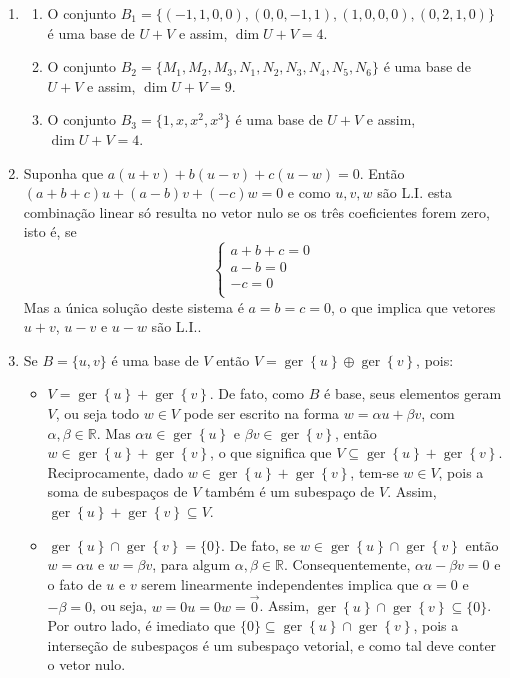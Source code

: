 \documentclass[12pt,a4paper]{article}
\newcommand*\ger[1]{\operatorname{ger}\left\{#1\right\}}
\newcommand*\R{\mathbb{R}}
\begin{document}
\begin{enumerate}
\begin{enumerate}
\end{enumerate}

\item \begin{enumerate}
\item O conjunto $B_1 = \{ (-1,1,0,0), (0,0,-1,1), (1,0,0,0), (0,2,1,0) \}$ é uma base de $U+V$ e assim, $\dim{U+V} = 4$.
\item O conjunto $B_2 = \{ M_1, M_2, M_3, N_1, N_2, N_3, N_4, N_5, N_6 \}$ é uma base de $U+V$ e assim, $\dim{U+V} = 9$.
\item O conjunto $B_3 = \{ 1, x, x^2, x^3 \}$ é uma base de $U+V$ e assim, $\dim{U+V} = 4$.
\end{enumerate}


\item Suponha que $a(u+v) + b(u-v) + c(u-w) = 0$. Então $(a+b+c)u+(a-b)v + (-c)w = 0$ e como $u,v,w$ são L.I. esta combinação linear só resulta no vetor nulo se os três coeficientes forem zero, isto é, se
\[
\begin{cases}
a+b+c=0\\
a-b=0\\
-c=0\\
\end{cases}
\]
Mas a única solução deste sistema é $a=b=c=0$, o que implica que vetores $u+v$, $u-v$ e $u-w$ são L.I..

\item Se $B = \{u, v\}$ é uma base de $V$ então $V = \ger{u} \oplus \ger{v}$, pois:
\begin{itemize}
\item $V = \ger{u} + \ger{v}$. De fato, como $B$ é base, seus elementos geram $V$, ou seja todo $w \in V$ pode ser escrito na forma $w = \alpha u + \beta v$, com $\alpha, \beta \in \R$. Mas $\alpha u \in \ger{u}$ e $\beta v \in \ger{v}$, então $w \in \ger{u} + \ger{v}$, o que significa que $V \subseteq \ger{u} + \ger{v}$. Reciprocamente, dado $w \in \ger{u} + \ger{v}$, tem-se $w \in V$, pois a soma de subespaços de $V$ também é um subespaço de $V$. Assim, $\ger{u} + \ger{v} \subseteq V$.
\item $\ger{u} \cap \ger{v} = \{ 0 \}$. De fato, se $w \in \ger{u} \cap \ger{v}$ então $w = \alpha u$ e $w = \beta v$, para algum $\alpha, \beta \in \R$. Consequentemente, $\alpha u - \beta v = 0$ e o fato de $u$ e $v$ serem linearmente independentes implica que $\alpha = 0$ e $-\beta = 0$, ou seja, $w = 0 u = 0 w = \vec{0}$.
Assim, $\ger{u} \cap \ger{v} \subseteq \{ 0 \}$. Por outro lado, é imediato que $\{ 0 \} \subseteq \ger{u} \cap \ger{v}$, pois a interseção de subespaços é um subespaço vetorial, e como tal deve conter o vetor nulo.
\end{itemize}


\end{enumerate}
\end{document}
